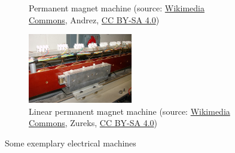 \begin{frame}
\begin{figure}
\begin{subfigure}[b]{0.49\textwidth}
			\caption{Permanent magnet machine (source: \href{https://commons.wikimedia.org/wiki/File:Wheel_hub_motor_of_an_electric_kick_scooter,_sidepanel_removed_(2022).jpg}{Wikimedia Commons}, Andrez, \href{https://creativecommons.org/licenses/by-sa/4.0/deed.en}{CC BY-SA 4.0})}
		\end{subfigure}
		\hfill
		\begin{subfigure}[b]{0.49\textwidth}
			\centering
			\includegraphics[width=0.5\textwidth]{fig/lec01/Linear_motor.jpg}
			\caption{Linear permanent magnet machine (source: \href{https://commons.wikimedia.org/wiki/File:Linear_motor_by_Zureks.jpg}{Wikimedia Commons}, Zureks, \href{https://creativecommons.org/licenses/by-sa/4.0/n}{CC BY-SA 4.0})}
		\end{subfigure}
		\caption*{Some exemplary electrical machines} 
        \label{fig:examples_machine_drives_00}
	\end{figure}
\end{frame}


